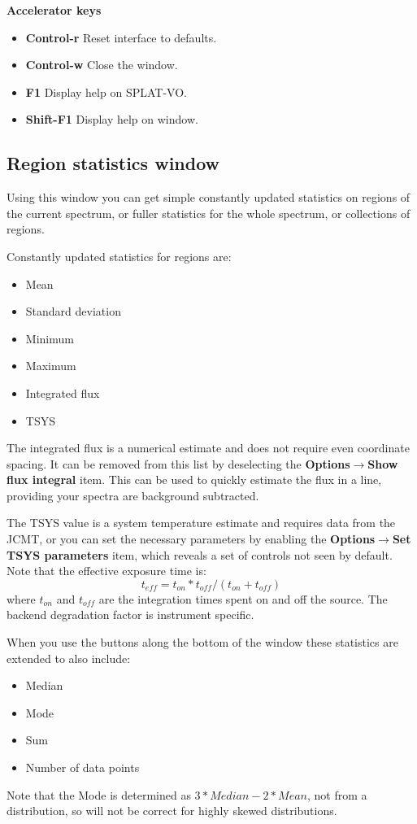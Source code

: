 \documentclass[twoside,11pt]{article}
\newcommand{\latexhtml}[2]{#1}
\renewcommand{\_}{\texttt{\symbol{95}}}
\newcommand{\SPLAT}{\textsf{SPLAT-VO}}
\newcommand{\submenuitem}[2]{\latexhtml{\textbf{#1$\rightarrow$#2}}{\textbf{#1->#2}}}
\newcommand{\labelitem}[1]{\textbf{#1}}
\newcommand{\subheading}[1]{\textbf{\large{#1}}}
\begin{document}
\subheading{Accelerator keys}

\begin{itemize}
\item \labelitem{Control-r} Reset interface to defaults.

\item \labelitem{Control-w} Close the window.
\item \labelitem{F1} Display help on \SPLAT.
\item \labelitem{Shift-F1} Display help on window.
\end{itemize}


\newpage
\subsection{Region statistics window}

Using this window you can get simple constantly updated statistics on regions
of the current spectrum, or fuller statistics for the whole spectrum, or
collections of regions.

Constantly updated statistics for regions are:
\begin{itemize}
\item Mean
\item Standard deviation
\item Minimum
\item Maximum
\item Integrated flux
\item TSYS
\end{itemize}

The integrated flux is a numerical estimate and does not require
even coordinate spacing.
It can be removed from this list by deselecting the
\submenuitem{Options}{Show flux integral} item. This can be used to quickly
estimate the flux in a line, providing your spectra are background
subtracted.

The TSYS value is a system temperature estimate and requires data
from the JCMT, or you can set the necessary parameters by enabling the
\submenuitem{Options}{Set TSYS parameters} item, which reveals a set of
controls not seen by default. Note that the effective exposure time is:
\[
t_{eff}=t_{on}*t_{off}/(t_{on}+t_{off})
\]
where $t_{on}$ and $t_{off}$ are the integration times spent on and off the
source. The backend degradation factor is instrument specific.


When you use the buttons along the bottom of the window these statistics are
extended to also include:
\begin{itemize}
\item Median
\item Mode
\item Sum
\item Number of data points
\end{itemize}
Note that the Mode is determined as $3*Median-2*Mean$, not from a
distribution, so will not be correct for highly skewed distributions.
\end{document}
